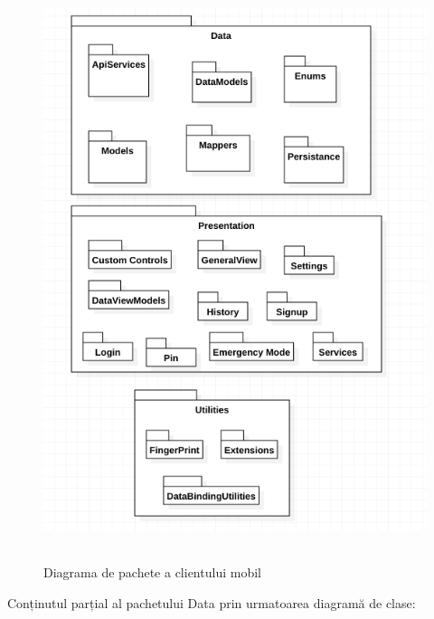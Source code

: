 \documentclass[12pt]{article}
\begin{document}
\begin{figure}[H]
    \centering
    \includegraphics[width=14cm, height=17cm]{pacheteclient.png}
    \caption{Diagrama de pachete a clientului mobil}
    \end{figure}


Conținutul parțial al pachetului Data prin urmatoarea diagramă de clase:
\end{document}

